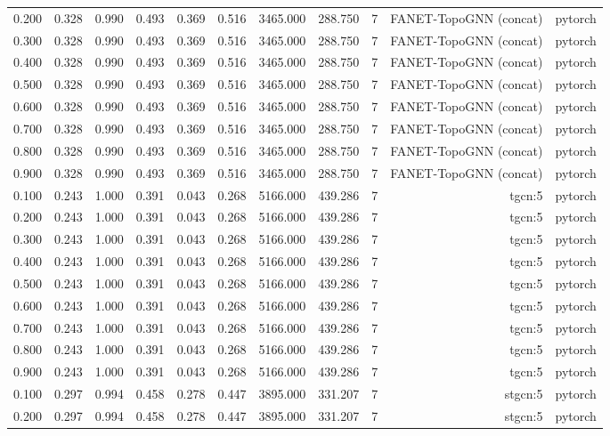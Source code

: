 \begin{tabular}{lrrrrrrrrrr}
0.200 & 0.328 & 0.990 & 0.493 & 0.369 & 0.516 & 3465.000 & 288.750 & 7 & FANET-TopoGNN (concat) & pytorch \\
0.300 & 0.328 & 0.990 & 0.493 & 0.369 & 0.516 & 3465.000 & 288.750 & 7 & FANET-TopoGNN (concat) & pytorch \\
0.400 & 0.328 & 0.990 & 0.493 & 0.369 & 0.516 & 3465.000 & 288.750 & 7 & FANET-TopoGNN (concat) & pytorch \\
0.500 & 0.328 & 0.990 & 0.493 & 0.369 & 0.516 & 3465.000 & 288.750 & 7 & FANET-TopoGNN (concat) & pytorch \\
0.600 & 0.328 & 0.990 & 0.493 & 0.369 & 0.516 & 3465.000 & 288.750 & 7 & FANET-TopoGNN (concat) & pytorch \\
0.700 & 0.328 & 0.990 & 0.493 & 0.369 & 0.516 & 3465.000 & 288.750 & 7 & FANET-TopoGNN (concat) & pytorch \\
0.800 & 0.328 & 0.990 & 0.493 & 0.369 & 0.516 & 3465.000 & 288.750 & 7 & FANET-TopoGNN (concat) & pytorch \\
0.900 & 0.328 & 0.990 & 0.493 & 0.369 & 0.516 & 3465.000 & 288.750 & 7 & FANET-TopoGNN (concat) & pytorch \\
0.100 & 0.243 & 1.000 & 0.391 & 0.043 & 0.268 & 5166.000 & 439.286 & 7 & tgcn:5 & pytorch \\
0.200 & 0.243 & 1.000 & 0.391 & 0.043 & 0.268 & 5166.000 & 439.286 & 7 & tgcn:5 & pytorch \\
0.300 & 0.243 & 1.000 & 0.391 & 0.043 & 0.268 & 5166.000 & 439.286 & 7 & tgcn:5 & pytorch \\
0.400 & 0.243 & 1.000 & 0.391 & 0.043 & 0.268 & 5166.000 & 439.286 & 7 & tgcn:5 & pytorch \\
0.500 & 0.243 & 1.000 & 0.391 & 0.043 & 0.268 & 5166.000 & 439.286 & 7 & tgcn:5 & pytorch \\
0.600 & 0.243 & 1.000 & 0.391 & 0.043 & 0.268 & 5166.000 & 439.286 & 7 & tgcn:5 & pytorch \\
0.700 & 0.243 & 1.000 & 0.391 & 0.043 & 0.268 & 5166.000 & 439.286 & 7 & tgcn:5 & pytorch \\
0.800 & 0.243 & 1.000 & 0.391 & 0.043 & 0.268 & 5166.000 & 439.286 & 7 & tgcn:5 & pytorch \\
0.900 & 0.243 & 1.000 & 0.391 & 0.043 & 0.268 & 5166.000 & 439.286 & 7 & tgcn:5 & pytorch \\
0.100 & 0.297 & 0.994 & 0.458 & 0.278 & 0.447 & 3895.000 & 331.207 & 7 & stgcn:5 & pytorch \\
0.200 & 0.297 & 0.994 & 0.458 & 0.278 & 0.447 & 3895.000 & 331.207 & 7 & stgcn:5 & pytorch \\

\end{tabular}
